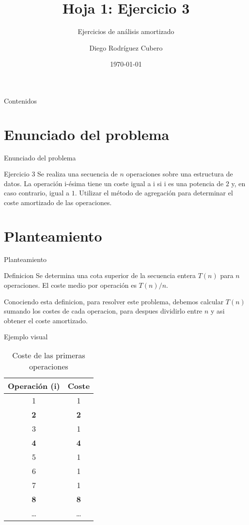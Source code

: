 \documentclass[aspectratio=169]{beamer}
\title{Hoja 1: Ejercicio 3}
\subtitle{Ejercicios de análisis amortizado}
\author{Diego Rodríguez Cubero}
\institute{UCM}
\date{\today}
\begin{document}
\begin{frame}
    \titlepage
\end{frame}

\begin{frame}{Contenidos}
    \tableofcontents
\end{frame}

\section{Enunciado del problema}
\begin{frame}{Enunciado del problema}
    \begin{block}{Ejercicio 3}
        Se realiza una secuencia de $n$ operaciones sobre una estructura de datos. La operación i-ésima tiene un coste igual a i si i es una potencia de $2$ y, en caso contrario, igual a $1$. Utilizar el método de agregación para determinar el coste amortizado de las operaciones.
    \end{block}
\end{frame}

\section{Planteamiento}
\begin{frame}{Planteamiento}
    \begin{exampleblock}{Definicion}
        Se determina una cota superior de la secuencia entera $T(n)$ para $n$ operaciones. El coste medio por operación es $T(n)/n$.
    \end{exampleblock}
    Conociendo esta definicion, para resolver este problema, debemos calcular $T(n)$ sumando los costes de cada operacion, para despues dividirlo entre $n$ y asi obtener el coste amortizado.
\end{frame}

\begin{frame}{Ejemplo visual}
    \begin{table}
        \centering
        \begin{tabular}{|c|c|}
            \hline
            \textbf{Operación (i)} & \textbf{Coste} \\
            \hline
            1 & 1 \\
            \textbf{2} & \textbf{2} \\
            3 & 1 \\
            \textbf{4} & \textbf{4} \\
            5 & 1 \\
            6 & 1 \\
            7 & 1 \\
            \textbf{8} & \textbf{8} \\
            \ldots & \ldots \\
            \hline
        \end{tabular}
        \caption{Coste de las primeras operaciones}
    \end{table}
\end{frame}
\end{document}
